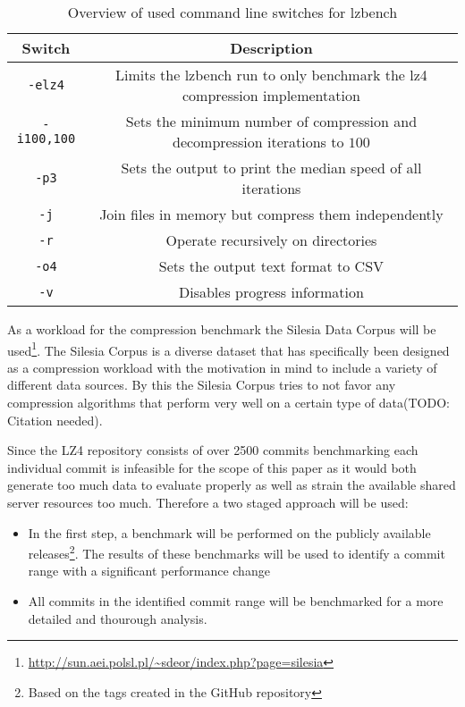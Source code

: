 \documentclass[	runningheads,
				a4paper]{llncs}
\begin{document}
	\begin{table}
		\caption{Overview of used command line switches for lzbench}
		\label{tab:cmd_switches}
		\centering
		\begin{tabular}{|c|c|}
			\hline
			\textbf{Switch} & \textbf{Description}\\
			\hline\hline
			\texttt{-elz4} & Limits the lzbench run to only benchmark the lz4 compression implementation \\
			\hline
			\texttt{-i100,100} & Sets the minimum number of compression and decompression iterations to $100$ \\
			\hline
			\texttt{-p3} & Sets the output to print the median speed of all iterations \\
			\hline
			\texttt{-j} & Join files in memory but compress them independently \\
			\hline
			\texttt{-r} & Operate recursively on directories \\
			\hline 
			\texttt{-o4} & Sets the output text format to CSV \\
			\hline
			\texttt{-v} & Disables progress information \\
			\hline
		\end{tabular}
	\end{table}
	
	As a workload for the compression benchmark the Silesia Data Corpus will be used\footnote{\url{http://sun.aei.polsl.pl/~sdeor/index.php?page=silesia}}. The Silesia Corpus is a diverse dataset that has specifically been designed as a compression workload with the motivation in mind to include a variety of different data sources. By this the Silesia Corpus tries to not favor any compression algorithms that perform very well on a certain type of data(TODO: Citation needed).

Since the LZ4 repository consists of over 2500 commits benchmarking each individual commit is infeasible for the scope of this paper as it would both generate too much data to evaluate properly as well as strain the available shared server resources too much. Therefore a two staged approach will be used:
\begin{itemize}
	\item In the first step, a benchmark will be performed on the publicly available releases\footnote{Based on the tags created in the GitHub repository}. The results of these benchmarks will be used to identify a commit range with a significant performance change
	\item All commits in the identified commit range will be benchmarked for a more detailed and thourough analysis.
\end{itemize}
\end{document}
